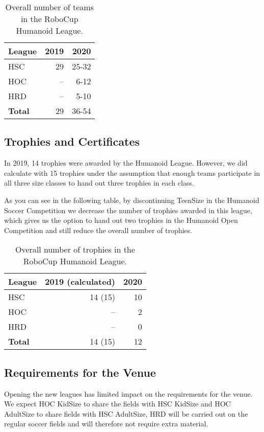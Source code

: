 \documentclass{article}
\begin{document}
\begin{table}[h]
  \centering
  \begin{tabular}{l | r | r}
    League & 2019 & 2020\\
    \hline
    HSC & 29 & 25-32\\ 
    HOC & -- & 6-12\\
    HRD & -- & 5-10\\
    \hline
    \textbf{Total} & 29 & 36-54
  \end{tabular}
  \caption{Overall number of teams in the RoboCup Humanoid League.}

\end{table}


\subsection{Trophies and Certificates}

In 2019, 14 trophies were awarded by the Humanoid League. However, we did calculate with 15 trophies under the assumption that enough teams participate in all three size classes to hand out three trophies in each class. 

As you can see in the following table,
by discontinuing TeenSize in the Humanoid Soccer Competition we decrease the
number of trophies awarded in this league,
which gives us the option to hand out two trophies in the Humanoid Open
Competition and still reduce the overall number of trophies.

\begin{table}[h]
  \centering
  \begin{tabular}{l | r | r}
    League & 2019 (calculated) & 2020\\
    \hline
    HSC & 14 (15) & 10\\ 
    HOC & -- & 2\\ 
    HRD & -- & 0\\
    \hline
    \textbf{Total} & 14 (15) & 12
  \end{tabular}
   \caption{Overall number of trophies in the RoboCup Humanoid League.}

\end{table}

\subsection{Requirements for the Venue}

Opening the new leagues has limited impact on the requirements for the venue.
We expect HOC KidSize to share the fields with HSC KidSize and HOC AdultSize to share fields with HSC AdultSize,
HRD will be carried out on the regular soccer fields and will therefore not require
extra material.
\end{document}
